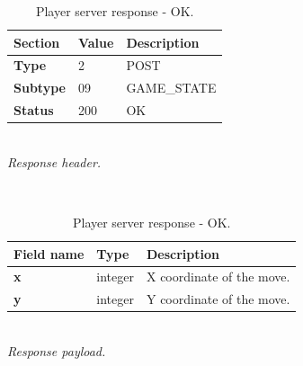 \documentclass[english, sem, kiv, he, iso690alph, pdf, viewonly]{fasthesis}
\begin{document}
\begin{table}[h!]
	\centering
	\begin{minipage}[b]{1.0\textwidth}
		\centering
		\begin{tabular}{|l|l|l|}
			\hline
			\textbf{Section} & \textbf{Value} & \textbf{Description} \\ \hline
			\textbf{Type} & 2 & \footnotesize{POST} \\ \hline
			\textbf{Subtype} & 09 & \footnotesize{GAME\_STATE}  \\ \hline
			\textbf{Status} & 200 & \footnotesize{OK} \\ \hline
		\end{tabular} \\
		\textit{Response header.}
	\end{minipage} 
	\\
	\vspace{10pt}
	\begin{minipage}[b]{1.0\textwidth}
		\centering
		\begin{tabular}{|l|l|l|}
			\hline
			\textbf{Field name} & \textbf{Type} & \textbf{Description} \\ \hline
			\textbf{x} & integer & X coordinate of the move. \\ \hline
            \textbf{y} & integer & Y coordinate of the move. \\ \hline
		\end{tabular} \\
		\textit{Response payload.}
	\end{minipage}	
	\caption{Player server response - OK.}
	\label{tab:player_move_response_ok}
\end{table}
\end{document}

